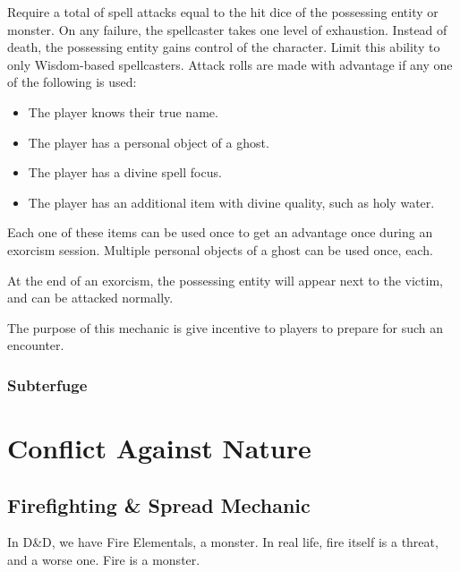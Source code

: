 \documentclass[twocolumn]{dndbook}
\begin{document}

Require a total of spell attacks equal to the hit dice of the possessing entity or monster.
On any failure, the spellcaster takes one level of exhaustion. Instead of death, the possessing entity gains control of the character.
Limit this ability to only Wisdom-based spellcasters. %
Attack rolls are made with advantage if any one of the following is used:
\begin{itemize}
	\item The player knows their true name.
	\item The player has a personal object of a ghost.
	\item The player has a divine spell focus.
	\item The player has an additional item with divine quality, such as holy water.
\end{itemize}

Each one of these items can be used once to get an advantage once during an exorcism session.
Multiple personal objects of a ghost can be used once, each.

At the end of an exorcism, the possessing entity will appear next to the victim, and can be attacked normally.\par

The purpose of this mechanic is give incentive to players to prepare for such an encounter.\par


\subsection{Subterfuge}


\chapter{Conflict Against Nature}
\section{Firefighting \& Spread Mechanic}

In D\&D, we have Fire Elementals, a monster.
In real life, fire itself is a threat, and a worse one.
Fire is a monster.\par
\end{document}

